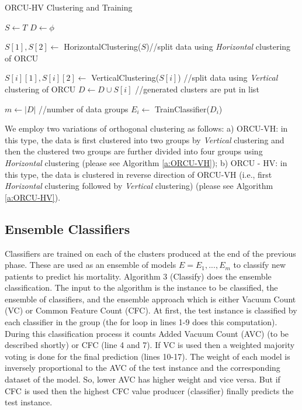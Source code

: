 \begin{algorithm} 
	\caption{ORCU-HV Clustering and Training} 
	\label{a:ORCU-HV}
	{%
		\begin{algorithmic}[1]  
			\STATE $S \leftarrow T$ 
			\STATE $D \leftarrow \phi$
			
			\STATE $S[1], S[2] \leftarrow$ HorizontalClustering($S$)//split data using \textit{Horizontal} clustering of ORCU					
			
			\STATE $S[i][1], S[i][2] \leftarrow$ VerticalClustering($S[i]$) //split data using \textit{Vertical} clustering of ORCU
			\STATE $D \leftarrow D \cup S[i]$ //generated clusters are put in list
			\ENDFOR
			
			\STATE $m \leftarrow |D|$ //number of data groups
			\STATE	$E_i \leftarrow $ TrainClassifier($D_i$)
			\ENDFOR    		
		\end{algorithmic}  
	} 
\end{algorithm} 

We employ two variations of orthogonal clustering as follows: a) ORCU-VH: in this type, the data is first clustered into two groups by \textit{Vertical} clustering and then the clustered two groups are further divided into four groups using \textit{Horizontal} clustering (please see Algorithm \ref{a:ORCU-VH}); b) ORCU - HV: in this type, the data is clustered in reverse direction of ORCU-VH (i.e., first \textit{Horizontal} clustering followed by \textit{Vertical} clustering) (please see Algorithm \ref{a:ORCU-HV}). 

\subsection{Ensemble Classifiers}
Classifiers are trained on each of the clusters produced at the end of the previous phase. These are used as an ensemble of models $E = {E_1, ...,E_m}$ to classify new patients to predict his mortality. Algorithm 3 (Classify) does the ensemble classification. The input to the algorithm is the instance to be classified, the ensemble of classifiers, and the ensemble approach which is either Vacuum Count (VC) or Common Feature Count (CFC). At first, the test instance is classified by each classifier in the group (the for loop in lines 1-9 does this computation). During this classification process it counts Added Vacuum Count (AVC) \cite{mehedy-masud:2017:fvc} (to be described shortly) or CFC (line 4 and 7). If VC is used then a weighted majority voting is done for the final prediction (lines 10-17). The weight of each model is inversely proportional to the AVC of the test instance and the corresponding dataset of the model. So, lower AVC has higher weight and vice versa. But if CFC is used then the highest CFC value producer (classifier) finally predicts the test instance.  


